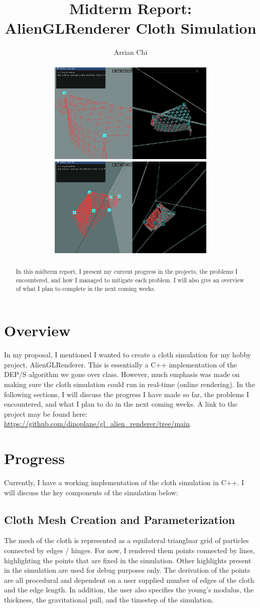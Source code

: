 \documentclass[letterpaper, 10 pt, conference]{ieeeconf}  %
\title{\LARGE \bf
Midterm Report: \\ 
\Large AlienGLRenderer Cloth Simulation
}
\author{Arrian Chi%
\\
\\
\includegraphics[width=8cm]{cloth1.PNG} \> \includegraphics[width=8cm]{cloth2.PNG} 
}
\begin{document}


\maketitle
\thispagestyle{empty}
\pagestyle{empty}



\begin{abstract}

        In this midterm report, I present my current progress in the projects, the problems I encountered, and how I managed to mitigate each problem. I will also give an overview of what I plan to complete in the next coming weeks. 

\end{abstract}
\section{Overview}

In my proposal, I mentioned I wanted to create a cloth simulation for my hobby project, AlienGLRenderer. This is essentially a C++ implementation of the DEP/S algorithm \cite{baraff1998large} \cite{Grinspun2003discrete} \cite{Tamstorf2013discrete} we gone over class. However, much emphasis was made on making sure the cloth simulation could run in real-time (online rendering). In the following sections, I will discuss the progress I have made so far, the problems I encountered, and what I plan to do in the next coming weeks. A link to the project may be found here: \url{https://github.com/dinoplane/gl_alien_renderer/tree/main}.

\section{Progress}
Currently, I have a working implementation of the cloth simulation in C++. I will discuss the key components of the simulation below:

\subsection{Cloth Mesh Creation and Parameterization}
The mesh of the cloth is represented as a equilateral triangluar grid of particles connected by edges / hinges. For now, I rendered them points connected by lines, highlighting the points that are fixed in the simulation. Other highlights present in the simulation are used for debug purposes only. The derivation of the points are all procedural and dependent on a user supplied number of edges of the cloth and the edge length. In addition, the user also specifies the young's modulus, the thickness, the gravitational pull, and the timestep of the simulation.
\end{document}
